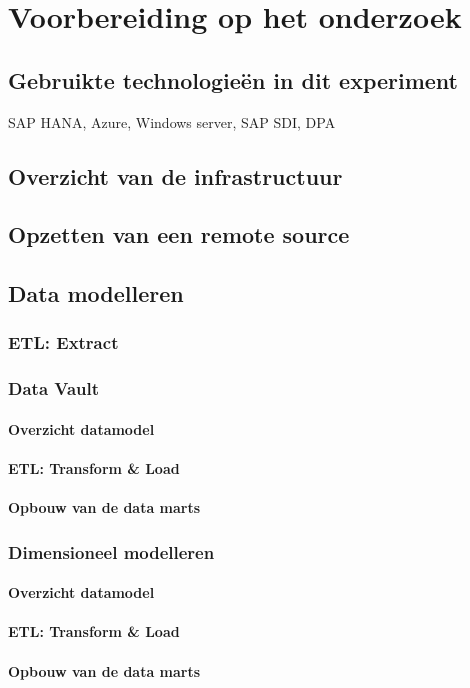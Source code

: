 
\chapter{Voorbereiding op het onderzoek}
\label{ch:voorbereidingonderzoek}

\section{Gebruikte technologieën in dit experiment}
SAP HANA, Azure, Windows server, SAP SDI, DPA

\section{Overzicht van de infrastructuur}

\section{Opzetten van een remote source}

\section{Data modelleren}

\subsection{ETL: Extract}

\subsection{Data Vault}

\subsubsection{Overzicht datamodel}

\subsubsection{ETL: Transform \& Load}

\subsubsection{Opbouw van de data marts}

\subsection{Dimensioneel modelleren}

\subsubsection{Overzicht datamodel}

\subsubsection{ETL: Transform \& Load}

\subsubsection{Opbouw van de data marts}